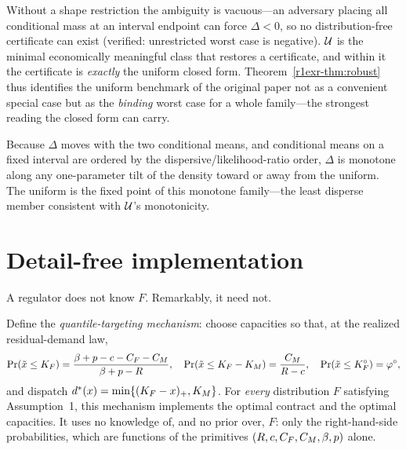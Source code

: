\begin{remark}
Without a shape restriction the ambiguity is vacuous---an adversary placing all
conditional mass at an interval endpoint can force $\Delta<0$, so no
distribution-free certificate can exist (verified: unrestricted worst case is
negative). $\mathcal U$ is the minimal economically meaningful class that restores a
certificate, and within it the certificate is \emph{exactly} the uniform
closed form. Theorem~\ref{r1exr-thm:robust} thus identifies the uniform benchmark of the
original paper not as a convenient special case but as the \emph{binding} worst
case for a whole family---the strongest reading the closed form can carry.
\end{remark}

\begin{remark}
Because $\Delta$ moves with the two conditional means, and conditional means on a
fixed interval are ordered by the dispersive/likelihood-ratio order, $\Delta$ is
monotone along any one-parameter tilt of the density toward or away from the
uniform. The uniform is the fixed point of this monotone family---the least
disperse member consistent with $\mathcal U$'s monotonicity.
\end{remark}

\section{Detail-free implementation}\label{r1exr-sec:detailfree}

A regulator does not know $F$. Remarkably, it need not.

\begin{theorem}\label{r1exr-thm:detailfree}
Define the \emph{quantile-targeting mechanism}: choose capacities so that, at the
realized residual-demand law,
\[
  \Pr(\tilde x\le K_F)=\frac{\beta+p-c-C_F-C_M}{\beta+p-R},\quad
  \Pr(\tilde x\le K_F-K_M)=\frac{C_M}{R-c},\quad
  \Pr(\tilde x\le K_F^{\circ})=\varphi^{\circ},
\]
and dispatch $d^{*}(x)=\min\{(K_F-x)_+,K_M\}$. For \emph{every} distribution $F$
satisfying Assumption~1, this mechanism implements the optimal contract and the
optimal capacities. It uses no knowledge of, and no prior over, $F$: only the
right-hand-side probabilities, which are functions of the primitives
$(R,c,C_F,C_M,\beta,p)$ alone.
\end{theorem}

